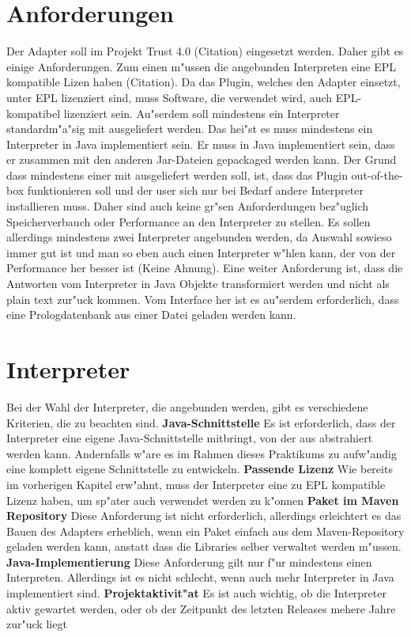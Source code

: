 

\section{Anforderungen}
Der Adapter soll im Projekt Trust 4.0 (Citation) eingesetzt werden. Daher gibt es einige Anforderungen. Zum einen m"ussen die angebunden Interpreten eine EPL kompatible Lizen haben (Citation). Da das Plugin, welches den Adapter einsetzt, unter EPL lizenziert sind, muss Software, die verwendet wird, auch EPL-kompatibel lizenziert sein. Au"serdem soll mindestens ein Interpreter standardm"a"sig mit ausgeliefert werden. Das hei"st es muss mindestens ein Interpreter in Java implementiert sein. Er muss in Java implementiert sein, dass er zusammen mit den anderen Jar-Dateien gepackaged werden kann. Der Grund dass mindestens einer mit ausgeliefert werden soll, ist, dass das Plugin out-of-the-box funktionieren soll und der user sich nur bei Bedarf andere Interpreter installieren muss. Daher sind auch keine gr"sen Anforderdungen bez"uglich Speicherverbauch oder Performance an den Interpreter zu stellen. Es sollen allerdings mindestens zwei Interpreter angebunden werden, da Auswahl sowieso immer gut ist und man so eben auch einen Interpreter w"hlen kann, der von der Performance her besser ist (Keine Ahnung). Eine weiter Anforderung ist, dass die Antworten vom Interpreter in Java Objekte transformiert werden und nicht als plain text zur"uck kommen. Vom Interface her ist es au"serdem erforderlich, dass eine Prologdatenbank aus einer Datei geladen werden kann.

\section{Interpreter}
Bei der Wahl der Interpreter, die angebunden werden, gibt es verschiedene Kriterien, die zu beachten sind. 
\textbf{Java-Schnittstelle} Es ist erforderlich, dass der Interpreter eine eigene Java-Schnittstelle mitbringt, von der aus abstrahiert werden kann. Andernfalls w"are es im Rahmen dieses Praktikums zu aufw"andig eine komplett eigene Schnittstelle zu entwickeln.
\textbf{Passende Lizenz} Wie bereits im vorherigen Kapitel erw"ahnt, muss der Interpreter eine zu EPL kompatible Lizenz haben, um sp"ater auch verwendet werden zu k"onnen
\textbf{Paket im Maven Repository} Diese Anforderung ist nicht erforderlich, allerdings erleichtert es das Bauen des Adapters erheblich, wenn ein Paket einfach aus dem Maven-Repository geladen werden kann, anstatt dass die Libraries selber verwaltet werden m"ussen.
\textbf{Java-Implementierung} Diese Anforderung gilt nur f"ur mindestens einen Interpreten. Allerdings ist es nicht schlecht, wenn auch mehr Interpreter in Java implementiert sind.
\textbf{Projektaktivit"at} Es ist auch wichtig, ob die Interpreter aktiv gewartet werden, oder ob der Zeitpunkt des letzten Releases mehere Jahre zur"uck liegt
